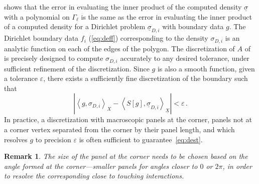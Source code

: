 \documentclass[12pt,times]{elsarticle}
\newcommand{\usigma}{\underline{\sigma}}
\newcommand{\uX}{\underline{X}}
\newtheorem{rem}{Remark}
\begin{document}
{ shows that the error in evaluating the inner product of the computed density $\usigma$ with a polynomial on
$\Gamma_{\ell}$ is the same as the error in evaluating the inner product of a computed density for a Dirichlet problem $\usigma_{D,i}$ with boundary data $g$. 
The Dirichlet boundary data $f_{i}$ (\cref{eq:deff}) corresponding to the density $\sigma_{D,i}$ is an analytic function on each of the edges of the polygon. 
The discretization of $A$ of~\cite{hoskins2019numerical} is precisely designed to compute $\sigma_{D,i}$ accurately to any desired tolerance, under sufficient refinement of the discretization. Since $g$ is also a smooth function, given a tolerance $\varepsilon$, there exists a sufficiently fine discretization of the boundary such that
\begin{equation}
\left| \left< g, \sigma_{D,i} \right>_{X} - \left< S[g], \usigma_{D,i} \right>_{\uX} \right| < \varepsilon \, . \label{eq:dest}
\end{equation}
In practice, a discretization with macroscopic panels at the corner, panels not at a corner vertex separated from the corner by their panel length, and which resolves $g$ to precision $\varepsilon$ is often sufficient to guarantee~\cref{eq:dest}. 
\begin{rem}
The size of the panel at the corner needs to be chosen based on the angle formed at the corner---smaller panels for angles closer to $0$ or $2\pi$, in order to resolve the corresponding close to touching interactions.
\end{rem}
} 
 
 
 
\end{document}
